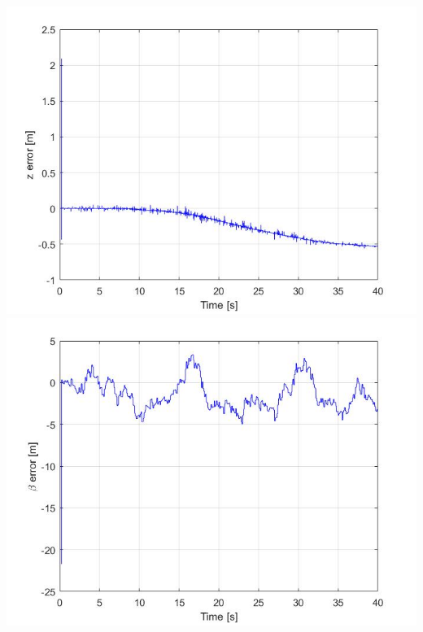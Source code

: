 \documentclass{beamer}
\begin{document}
\begin{frame}
\begin{columns}[t]
				\includegraphics[scale=0.18]{nlo_z_1}\\
				\includegraphics[scale=0.18]{nlo_beta_1}
			\end{columns}
	\end{frame}
\end{document}
